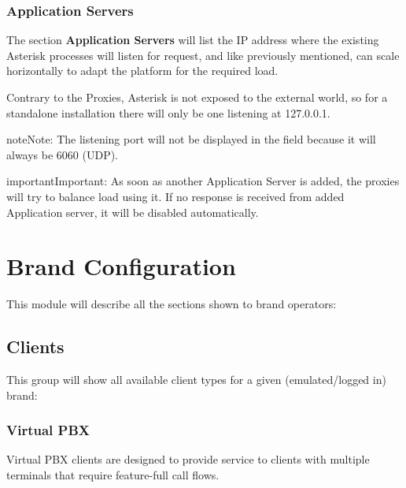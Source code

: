 \documentclass[letterpaper,10pt,english]{sphinxmanual}
\begin{document}
\subsection{Application Servers}
\label{administration_portal/platform/infrastructure/application_servers::doc}\label{administration_portal/platform/infrastructure/application_servers:application-servers}
The section \textbf{Application Servers} will list the IP address where the existing
Asterisk processes will listen for request, and like previously mentioned,
can scale horizontally to adapt the platform for the required load.

Contrary to the Proxies, Asterisk is not exposed to the external world, so
for a standalone installation there will only be one listening at 127.0.0.1.

\begin{notice}{note}{Note:}
The listening port will not be displayed in the field because it will
always be 6060 (UDP).
\end{notice}

\begin{notice}{important}{Important:}
As soon as another Application Server is added, the proxies will
try to balance load using it. If no response is received from added
Application server, it will be disabled automatically.
\end{notice}


\chapter{Brand Configuration}
\label{administration_portal/brand/index::doc}\label{administration_portal/brand/index:brand-configuration}
This module will describe all the sections shown to brand operators:


\section{Clients}
\label{administration_portal/brand/clients/index:clients}\label{administration_portal/brand/clients/index::doc}
This group will show all available client types for a given (emulated/logged in) brand:


\subsection{Virtual PBX}
\label{administration_portal/brand/clients/virtual_pbx::doc}\label{administration_portal/brand/clients/virtual_pbx:virtual-pbx}
Virtual PBX clients are designed to provide service to clients with multiple terminals
that require feature-full call flows.
\end{document}
